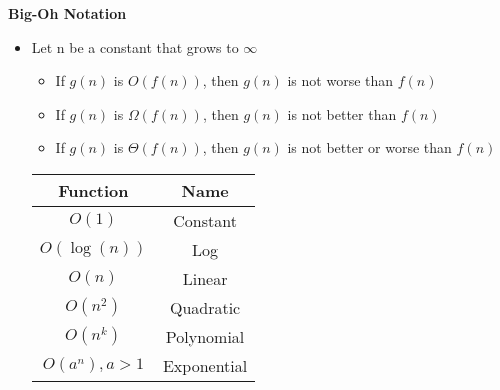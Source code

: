 \documentclass[10pt, 
a4paper, 
oneside, 
headinclude, footinclude, 
BCOR5mm]
{scrartcl}
\begin{document}
\textbf{Big-Oh Notation}
\begin{itemize}
    \item Let n be a constant that grows to $\infty$
    \begin{itemize}
        \item If $g(n)$ is $O(f(n))$, then $g(n)$ is not worse than $f(n)$
        \item If $g(n)$ is $\Omega(f(n))$, then $g(n)$ is not better than $f(n)$
        \item If $g(n)$ is $\Theta(f(n))$, then $g(n)$ is not better or worse than $f(n)$
    \end{itemize}
    \begin{center}
        \begin{tabular}{|c|c|}
            \hline
            \textbf{Function} & \textbf{Name} \\
            \hline
            $O(1)$ & Constant \\  
            \hline
            $O(\log(n))$ & Log \\
            \hline
            $O(n)$ & Linear \\
            \hline
            $O(n^2)$ & Quadratic \\  
            \hline   
            $O(n^k)$ & Polynomial \\
            \hline
            $O(a^n),a>1$ & Exponential \\
            \hline
        \end{tabular}
    \end{center}
\end{itemize}

\end{document}
